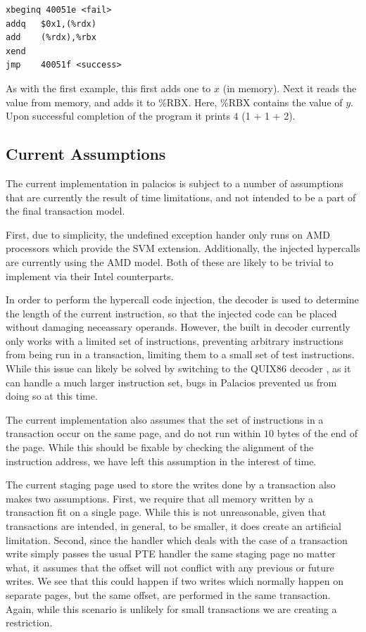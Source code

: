 \documentclass{acm_proc_article-sp}
\begin{document}
\begin{verbatim}
xbeginq 40051e <fail>
addq   $0x1,(%rdx)
add    (%rdx),%rbx
xend   
jmp    40051f <success>
\end{verbatim}

As with the first example, this first adds one to $x$ (in memory). Next it reads
the value from memory, and adds it to \%RBX. Here, \%RBX contains the value of $y$.
Upon successful completion of the program it prints $4$ ({1 + 1 + 2}).



\subsection{Current Assumptions}

The current implementation in palacios is subject to a number of assumptions
that are currently the result of time limitations, and not intended to be a
part of the final transaction model.

First, due to simplicity, the undefined exception hander only runs on AMD 
processors which provide the SVM extension. Additionally, the injected 
hypercalls are currently using the AMD model. Both of these are likely to be
trivial to implement via their Intel counterparts.  

In order to perform the hypercall code injection, the decoder is used to 
determine the length of the current instruction, so that the injected code
can be placed without damaging neceassary operands. However, the built in
decoder currently only works with a limited set of instructions, preventing
arbitrary instructions from being run in a transaction, limiting them to a 
small set of test instructions. While this issue can likely be solved by 
switching to the QUIX86 decoder \cite{quix86site}, as it can handle a much larger
instruction set, bugs in Palacios prevented us from doing so at this time.

The current implementation also assumes that the set of instructions in a 
transaction occur on the same page, and do not run within $10$ bytes of the
end of the page. While this should be fixable by checking the alignment of
the instruction address, we have left this assumption in the interest of 
time. 

The current staging page used to store the writes done by a transaction also
makes two assumptions. First, we require that all memory written by a 
transaction fit on a single page. While this is not unreasonable, given that
transactions are intended, in general, to be smaller, it does create an
artificial limitation. Second, since the handler which deals with the case
of a transaction write simply passes the usual PTE handler the same staging
page no matter what, it assumes that the offset will not conflict with any
previous or future writes. We see that this could happen if two writes which
normally happen on separate pages, but the same offset, are performed in the
same transaction. Again, while this scenario is unlikely for small transactions
we are creating a restriction.
 
\end{document}
